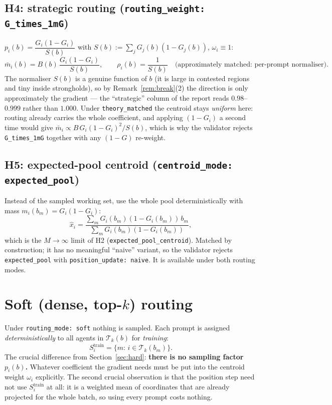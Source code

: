 \documentclass[11pt]{article}
\theoremstyle{remark}
\newcommand{\Tk}{\mathcal{T}_k}
\newcommand{\cfg}[1]{\texttt{#1}}
\begin{document}
\subsection{H4: strategic routing (\cfg{routing\_weight: G\_times\_1mG})}
$p_i(b)=\dfrac{G_i(1-G_i)}{S(b)}$ with $S(b):=\sum_j G_j(b)(1-G_j(b))$,
$\omega_i\equiv1$:
\begin{equation}
  \bar m_i(b) = B(b)\,\frac{G_i(1-G_i)}{S(b)},\qquad
  \rho_i(b)=\frac{1}{S(b)}\quad\text{(approximately matched: per-prompt normaliser).}
\end{equation}
The normaliser $S(b)$ is a genuine function of $b$ (it is large in contested
regions and tiny inside strongholds), so by Remark~\ref{rem:break}(2) the
direction is only approximately the gradient --- the ``strategic'' column of
the report reads $0.98$--$0.999$ rather than $1.000$. Under
\cfg{theory\_matched} the centroid stays \emph{uniform} here: routing already
carries the whole coefficient, and applying $(1-G_i)$ a second time would
give $\bar m_i\propto B\,G_i(1-G_i)^2/S(b)$, which is why the validator
rejects \cfg{G\_times\_1mG} together with any $(1-G)$ re-weight.

\subsection{H5: expected-pool centroid (\cfg{centroid\_mode: expected\_pool})}
Instead of the sampled working set, use the whole pool deterministically with
mass $m_i(b_m)=G_i(1-G_i)$:
\begin{equation}
  \hat x_i=\frac{\sum_m G_i(b_m)(1-G_i(b_m))\,b_m}{\sum_m G_i(b_m)(1-G_i(b_m))},
  \label{eq:pool}
\end{equation}
which is the $M\to\infty$ limit of H2 (\texttt{expected\_pool\_centroid}).
Matched by construction; it has no meaningful ``naive'' variant, so the
validator rejects \cfg{expected\_pool} with \cfg{position\_update: naive}.
It is available under both routing modes.

\section{Soft (dense, top-$k$) routing}
\label{sec:soft}

Under \cfg{routing\_mode: soft} nothing is sampled. Each prompt is assigned
\emph{deterministically} to all agents in $\Tk(b)$ for \emph{training}:
\begin{equation}
  S_i^{\mathrm{train}}=\{m:\,i\in\Tk(b_m)\} .
  \label{eq:softS}
\end{equation}
The crucial difference from Section~\ref{sec:hard}: \textbf{there is no
sampling factor $p_i(b)$.} Whatever coefficient the gradient needs must be
put into the centroid weight $\omega_i$ explicitly. The second crucial
observation is that the position step need not use $S_i^{\mathrm{train}}$
at all: it is a weighted mean of coordinates that are already projected
for the whole batch, so using every prompt costs nothing.
\end{document}
